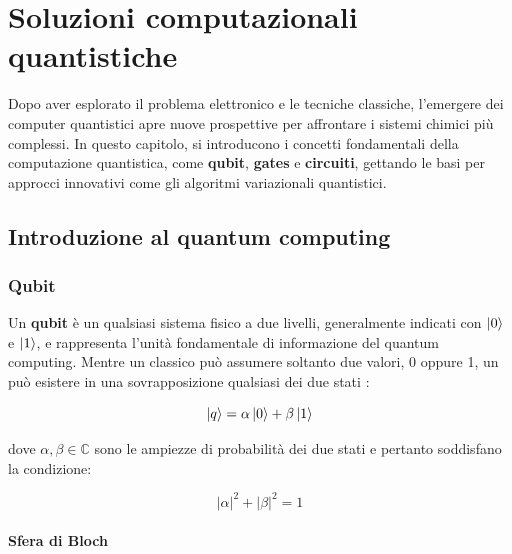 
\chapter{Soluzioni computazionali quantistiche}

Dopo aver esplorato il problema elettronico e le tecniche classiche, l’emergere dei computer quantistici apre nuove prospettive per affrontare i sistemi chimici più complessi. In questo capitolo, si introducono i concetti fondamentali della computazione quantistica, come \textbf{qubit}, \textbf{gates} e \textbf{circuiti}, gettando le basi per approcci innovativi come gli algoritmi variazionali quantistici.


\section{Introduzione al quantum computing}

\subsection{Qubit}

Un \textbf{qubit} è un qualsiasi sistema fisico a due livelli, generalmente indicati con $\ket{0}$ e $\ket{1}$, e rappresenta l'unità fondamentale di informazione del quantum computing. 
Mentre un  classico può assumere soltanto due valori, 0 oppure 1, un  può esistere in una sovrapposizione qualsiasi dei due stati \cite{FernandezCombarro2020,Nielsen_Chuang_2010}:

\begin{equation}\label{eqn:qubit}
    \ket{q} = \alpha \ket{0} + \beta \ket{1}
\end{equation}

dove $\alpha,\beta\in\mathbb{C}$ sono le ampiezze di probabilità dei due stati e pertanto soddisfano la condizione:

\begin{equation}\label{eqn:misura-unitaria}
    |\alpha|^2 + |\beta|^2 = 1
\end{equation}

\subsubsection{Sfera di Bloch}

